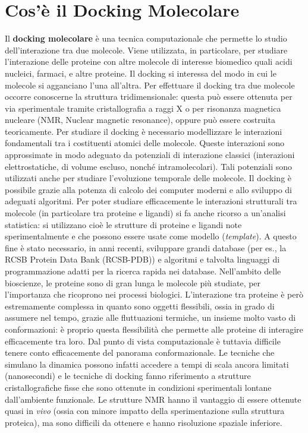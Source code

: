 \section{Cos'è il Docking Molecolare}
Il \textbf{docking molecolare} è una tecnica computazionale che permette lo studio dell’interazione tra due molecole. Viene utilizzata, in particolare, per studiare l’interazione delle proteine con altre molecole di interesse biomedico quali acidi nucleici, farmaci, e altre proteine. Il docking si interessa del modo in cui le molecole si agganciano l’una all’altra.\newline
Per effettuare il docking tra due molecole occorre conoscerne la struttura tridimensionale: questa può essere ottenuta per via sperimentale tramite cristallografia a raggi X o per risonanza magnetica nucleare (NMR, Nuclear magnetic resonance), oppure può essere costruita teoricamente. Per studiare il docking è necessario modellizzare le interazioni fondamentali tra i costituenti atomici delle molecole. Queste interazioni sono approssimate in modo adeguato da potenziali di interazione classici (interazioni elettrostatiche, di volume escluso, nonché intramolecolari). Tali potenziali sono utilizzati anche per studiare l’evoluzione temporale delle molecole.\newline 
Il docking è possibile grazie alla potenza di calcolo dei computer moderni e allo sviluppo di adeguati algoritmi. Per poter studiare efficacemente le interazioni strutturali tra molecole (in particolare tra proteine e ligandi) si fa anche ricorso a un’analisi statistica: si utilizzano cioè le strutture di proteine e ligandi note sperimentalmente e che possono essere usate come modello (\textit{template}). A questo fine è stato necessario, in anni recenti, sviluppare grandi database (per es., la RCSB Protein Data Bank (RCSB-PDB)) e algoritmi e talvolta linguaggi di programmazione adatti per la ricerca rapida nei database. Nell’ambito delle bioscienze, le proteine sono di gran lunga le molecole più studiate, per l’importanza che ricoprono nei processi biologici. L’interazione tra proteine è però estremamente complessa in quanto sono oggetti flessibili, ossia in grado di assumere nel tempo, grazie alle fluttuazioni termiche, un insieme molto vasto di conformazioni: è proprio questa flessibilità che permette alle proteine di interagire efficacemente tra loro. Dal punto di vista computazionale è tuttavia difficile tenere conto efficacemente del panorama conformazionale. Le tecniche che simulano la dinamica possono infatti accedere a tempi di scala ancora limitati (nanosecondi) e le tecniche di docking fanno riferimento a strutture cristallografiche fisse che sono ottenute in condizioni sperimentali lontane dall’ambiente funzionale. Le strutture NMR hanno il vantaggio di essere ottenute quasi in \textit{vivo} (ossia con minore impatto della sperimentazione sulla struttura proteica), ma sono difficili da ottenere e hanno risoluzione spaziale inferiore.\newline
